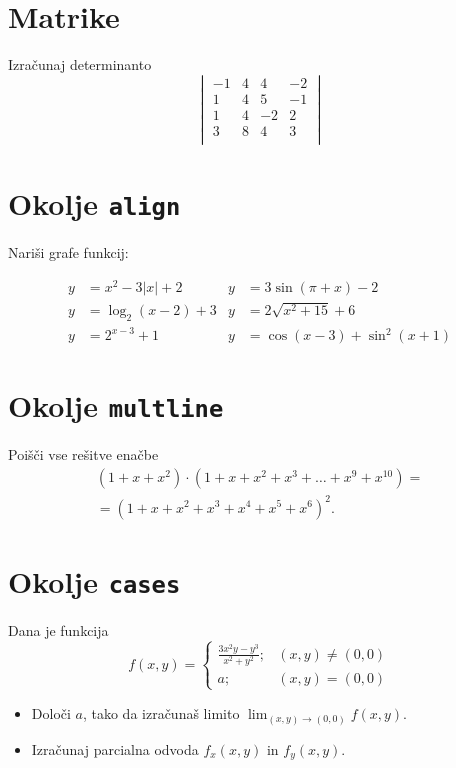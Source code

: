 \documentclass[a4paper,12pt]{article}
\begin{document}
\section*{Matrike}
Izračunaj determinanto
\[
\begin{vmatrix}
   -1 & 4 & 4 & -2 \\
   1 & 4 & 5 & -1 \\
   1 & 4 & -2 & 2 \\
   3 & 8 & 4 & 3 \\
\end{vmatrix}
\]
\section*{Okolje \texttt{align}}
Nariši grafe funkcij:

\begin{align*}
y &= x^2 - 3|x| + 2    &  y &= 3 \sin(\pi+x) - 2 \\
y &= \log_2(x-2) + 3   &  y &= 2 \sqrt{x^2+15} + 6 \\
y &= 2^{x-3} + 1       &  y &= \cos(x-3) + \sin^2(x+1)
\end{align*}


\section*{Okolje \texttt{multline}}
Poišči vse rešitve enačbe
\begin{multline*}
(1+x+x^2) \cdot (1+x+x^2+x^3+\ldots+x^9+x^{10}) =\\
=(1+x+x^2+x^3+x^4+x^5+x^6)^2.
\end{multline*}

\section*{Okolje \texttt{cases}}
Dana je funkcija
   \[ f(x,y)= \begin{cases} 
      \frac{3x^2y-y^3}{x^2+y^2}; & (x,y)\neq(0,0)\\
      a; & (x,y)=(0,0)
      \end{cases}
   \]
\begin{itemize}
\item Določi \(a\), tako da izračunaš limito \( \lim_{(x,y)\to(0,0)} f(x,y) \).
\item Izračunaj parcialna odvoda \(f_x(x,y)\) in \(f_y(x,y)\).
\end{itemize}
\end{document}
